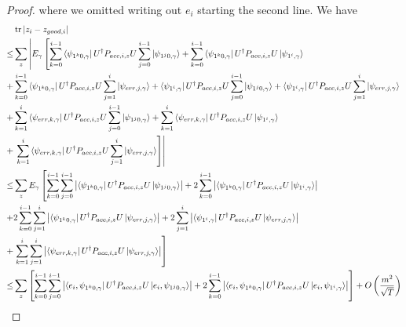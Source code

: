 \begin{proof}


 where we omitted writing out $e_i$ starting the second line.  We have 
\begin{align} \label{eq:zi-zgoodi}
    &\tr|z_i-z_{good,i}|   \nn \\
    \leq&  \sum_z  \L| E_\gamma \L[\sum_{k=0}^{i-1} \bra{\psi_{1^k0,\gamma}}U^\dag  P_{acc,i,z}U   \sum_{j=0}^{i-1} \ket{\psi_{1^j0,\gamma}}+
    \sum_{k=0}^{i-1} \bra{\psi_{1^k0,\gamma}}U^\dag  P_{acc,i,z}U \ket{\psi_{1^i,\gamma}}  \R. \R. \nn \\
      +&  \sum_{k=0}^{i-1} \bra{\psi_{1^k0,\gamma}}U^\dag  P_{acc,i,z}U\sum_{j=1}^{i}\ket{\psi_{err,j,\gamma}}
    +\bra{\psi_{1^i,\gamma}} U^\dag  P_{acc,i,z}U \sum_{j=0}^{i-1} \ket{\psi_{1^j0,\gamma}}
    +\bra{\psi_{1^i,\gamma}} U^\dag  P_{acc,i,z}U \sum_{j=1}^{i}\ket{\psi_{err,j,\gamma}} \nn \\
    +& \sum_{k=1}^{i}\bra{\psi_{err,k,\gamma}} U^\dag  P_{acc,i,z}U  \sum_{j=0}^{i-1} \ket{\psi_{1^j0,\gamma}} 
    +\sum_{k=1}^{i}\bra{\psi_{err,k,\gamma}} U^\dag  P_{acc,i,z}U \ket{\psi_{1^i,\gamma}} \nn \\
    +&\L.\L.\sum_{k=1}^{i}\bra{\psi_{err,k,\gamma}} U^\dag  P_{acc,i,z}U \sum_{j=1}^{i}\ket{\psi_{err,j,\gamma}} \R]\R| \nn \\  %
    \leq&  \sum_z   E_\gamma \L[\sum_{k=0}^{i-1} \sum_{j=0}^{i-1} \L| \bra{\psi_{1^k0,\gamma}}U^\dag  P_{acc,i,z}U    \ket{\psi_{1^j0,\gamma}} \R|+
    2 \sum_{k=0}^{i-1} \L|\bra{\psi_{1^k0,\gamma}}U^\dag  P_{acc,i,z}U \ket{\psi_{1^i,\gamma}} \R|  \R.  \nn \\
      +&  2 \sum_{k=0}^{i-1}\sum_{j=1}^{i}\L| \bra{\psi_{1^k0,\gamma}}U^\dag  P_{acc,i,z}U\ket{\psi_{err,j,\gamma}}\R|    
    +2 \sum_{j=1}^{i}\L|\bra{\psi_{1^i,\gamma}} U^\dag  P_{acc,i,z}U \ket{\psi_{err,j,\gamma}}\R| \nn \\
    +&\L. \sum_{k=1}^{i}\sum_{j=1}^{i}\L| \bra{\psi_{err,k,\gamma}} U^\dag  P_{acc,i,z}U \ket{\psi_{err,j,\gamma}}\R| \R] \nn \\ %
      \leq&  \sum_z   \L[\sum_{k=0}^{i-1} \sum_{j=0}^{i-1} \L| \bra{e_i,\psi_{1^k0,\gamma}}U^\dag  P_{acc,i,z}U    \ket{e_i,\psi_{1^j0,\gamma}} \R|+
    2 \sum_{k=0}^{i-1} \L|\bra{e_i,\psi_{1^k0,\gamma}}U^\dag  P_{acc,i,z}U \ket{e_i,\psi_{1^i,\gamma}} \R|  \R]    +O\L(\frac{m^2}{\sqrt T}\R)\nn \\ %

\end{align}
\end{proof}
